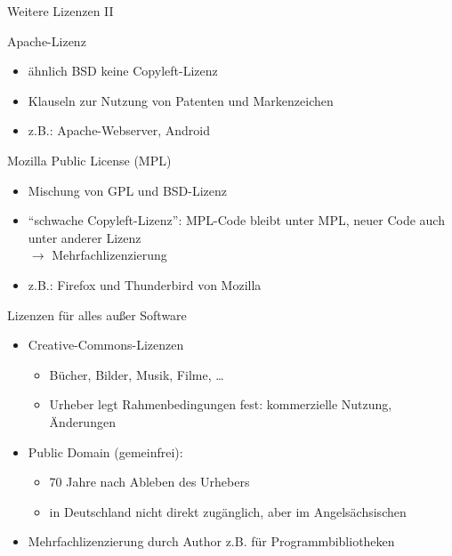 \documentclass[aspectratio=43]{beamer}
\begin{document}
\begin{frame}{Weitere Lizenzen II}
\begin{block}{Apache-Lizenz}
  \begin{itemize}
    \item ähnlich BSD keine Copyleft-Lizenz
    \item Klauseln zur Nutzung von Patenten und Markenzeichen
    \item z.B.: Apache-Webserver, Android
  \end{itemize}
\end{block}
\begin{block}{Mozilla Public License (MPL)}
  \begin{itemize}
    \item  Mischung von GPL und BSD-Lizenz
    \item  ``schwache Copyleft-Lizenz'': MPL-Code bleibt unter MPL, 
          neuer Code auch unter anderer Lizenz\\
    $\rightarrow$ Mehrfachlizenzierung
    \item z.B.: Firefox und Thunderbird von Mozilla
  \end{itemize}
\end{block}
\end{frame}

\begin{frame}{Lizenzen für alles außer Software}
\begin{block}{}
  \begin{itemize}
    \item Creative-Commons-Lizenzen
    \begin{itemize}
      \item Bücher, Bilder, Musik, Filme, \dots
      \item Urheber legt Rahmenbedingungen fest: kommerzielle Nutzung, Änderungen
    \end{itemize}
    \item Public Domain (gemeinfrei):
    \begin{itemize}
      \item 70 Jahre nach Ableben des Urhebers
      \item in Deutschland nicht direkt zugänglich, aber im Angelsächsischen
    \end{itemize}
    \item Mehrfachlizenzierung durch Author z.B. für Programmbibliotheken
  \end{itemize}
\end{block}
\end{frame}
\end{document}
